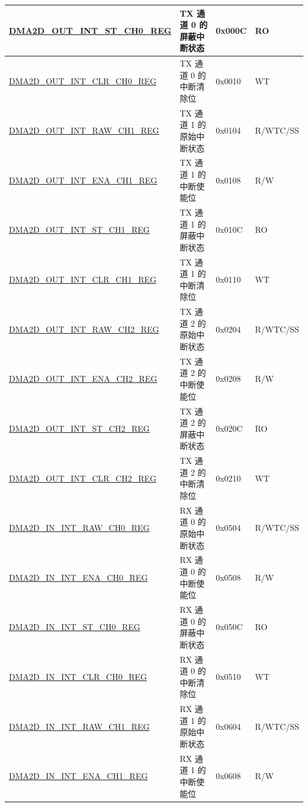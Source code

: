 \begin{longtable}{ | p{7cm} | p{11.5cm} | p{1.3cm} | p{2cm} | }
\hyperref[regdesc:DMA2DOUTINTSTCHNREG]{DMA2D\_OUT\_INT\_ST\_CH0\_REG} & TX 通道 0 的屏蔽中断状态 & 0x000C & RO \\ \hline
\hyperref[regdesc:DMA2DOUTINTCLRCHNREG]{DMA2D\_OUT\_INT\_CLR\_CH0\_REG} & TX 通道 0 的中断清除位 & 0x0010 & WT \\ \hline
\hyperref[regdesc:DMA2DOUTINTRAWCHNREG]{DMA2D\_OUT\_INT\_RAW\_CH1\_REG} & TX 通道 1 的原始中断状态 & 0x0104 & R/WTC/SS \\ \hline
\hyperref[regdesc:DMA2DOUTINTENACHNREG]{DMA2D\_OUT\_INT\_ENA\_CH1\_REG} & TX 通道 1 的中断使能位 & 0x0108 & R/W \\ \hline
\hyperref[regdesc:DMA2DOUTINTSTCHNREG]{DMA2D\_OUT\_INT\_ST\_CH1\_REG} & TX 通道 1 的屏蔽中断状态 & 0x010C & RO \\ \hline
\hyperref[regdesc:DMA2DOUTINTCLRCHNREG]{DMA2D\_OUT\_INT\_CLR\_CH1\_REG} & TX 通道 1 的中断清除位 & 0x0110 & WT \\ \hline
\hyperref[regdesc:DMA2DOUTINTRAWCHNREG]{DMA2D\_OUT\_INT\_RAW\_CH2\_REG} & TX 通道 2 的原始中断状态 & 0x0204 & R/WTC/SS \\ \hline
\hyperref[regdesc:DMA2DOUTINTENACHNREG]{DMA2D\_OUT\_INT\_ENA\_CH2\_REG} & TX 通道 2 的中断使能位 & 0x0208 & R/W \\ \hline
\hyperref[regdesc:DMA2DOUTINTSTCHNREG]{DMA2D\_OUT\_INT\_ST\_CH2\_REG} & TX 通道 2 的屏蔽中断状态 & 0x020C & RO \\ \hline
\hyperref[regdesc:DMA2DOUTINTCLRCHNREG]{DMA2D\_OUT\_INT\_CLR\_CH2\_REG} & TX 通道 2 的中断清除位 & 0x0210 & WT \\ \hline
\hyperref[regdesc:DMA2DININTRAWCHNREG]{DMA2D\_IN\_INT\_RAW\_CH0\_REG} & RX 通道 0 的原始中断状态 & 0x0504 & R/WTC/SS \\ \hline
\hyperref[regdesc:DMA2DININTENACHNREG]{DMA2D\_IN\_INT\_ENA\_CH0\_REG} & RX 通道 0 的中断使能位 & 0x0508 & R/W \\ \hline
\hyperref[regdesc:DMA2DININTSTCHNREG]{DMA2D\_IN\_INT\_ST\_CH0\_REG} & RX 通道 0 的屏蔽中断状态 & 0x050C & RO \\ \hline
\hyperref[regdesc:DMA2DININTCLRCHNREG]{DMA2D\_IN\_INT\_CLR\_CH0\_REG} & RX 通道 0 的中断清除位 & 0x0510 & WT \\ \hline
\hyperref[regdesc:DMA2DININTRAWCHNREG]{DMA2D\_IN\_INT\_RAW\_CH1\_REG} & RX 通道 1 的原始中断状态 & 0x0604 & R/WTC/SS \\ \hline
\hyperref[regdesc:DMA2DININTENACHNREG]{DMA2D\_IN\_INT\_ENA\_CH1\_REG} & RX 通道 1 的中断使能位 & 0x0608 & R/W \\ \hline

\end{longtable}
